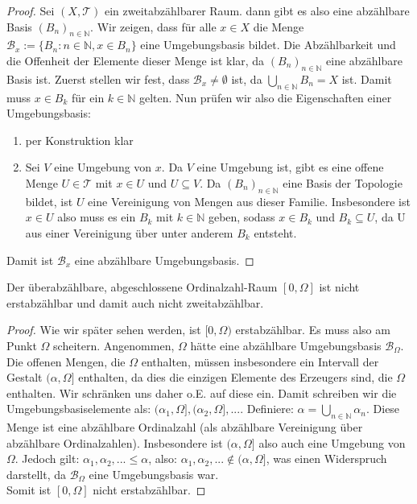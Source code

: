 \documentclass[11pt]{scrartcl}
\begin{document}
\begin{proof}
	Sei $(X,\mathcal T)$ ein zweitabzählbarer Raum. dann gibt es also 
	eine abzählbare Basis $(B_n)_{n\in\mathbb N}$. Wir zeigen, dass für alle $x\in X$ die Menge
	$\mathcal B_x:=\{B_n: n\in \mathbb N, x\in B_n\}$ eine Umgebungsbasis bildet. Die Abzählbarkeit und die Offenheit der Elemente
	dieser Menge ist klar, da $(B_n)_{n\in\mathbb N}$ eine abzählbare Basis ist. Zuerst stellen wir fest, dass $\mathcal B_x\neq\emptyset$ ist,
	da $\bigcup_{n\in\mathbb N} B_n=X$ ist. Damit muss $x\in B_k$ für ein $k\in\mathbb N$ gelten. Nun prüfen wir also 
	die Eigenschaften einer Umgebungsbasis:
	\begin{enumerate}
		\item per Konstruktion klar
		\item Sei $V$ eine Umgebung von $x$. Da $V$ eine Umgebung ist, gibt es eine offene
			Menge $U\in\mathcal T$ mit $x\in U$ und $U\subseteq V$. Da 
			$(B_n)_{n\in\mathbb N}$ eine Basis der Topologie bildet, ist $U$ eine 
			Vereinigung von Mengen aus dieser Familie. Insbesondere ist $x\in U$ also
			muss es ein $B_k$ mit $k\in \mathbb N$ geben, sodass $x\in B_k$ und 
			$B_k\subseteq U$, da U aus einer Vereinigung über unter anderem $B_k$ entsteht.
	\end{enumerate}
	Damit ist $\mathcal B_x$ eine abzählbare Umgebungsbasis.
\end{proof}
\begin{theorem}
	Der überabzählbare, abgeschlossene Ordinalzahl-Raum $[0,\Omega]$ ist nicht erstabzählbar und 
	damit auch nicht zweitabzählbar.
\end{theorem}
\begin{proof}
	Wie wir später sehen werden, ist $[0,\Omega)$ erstabzählbar. Es muss also am Punkt $\Omega$ scheitern.
	Angenommen, $\Omega$ hätte eine abzählbare Umgebungsbasis $\mathcal B_\Omega$. Die offenen Mengen, die $\Omega$
	enthalten, müssen insbesondere ein Intervall der Gestalt $(\alpha, \Omega]$ enthalten, da dies die einzigen 
	Elemente des Erzeugers sind, die $\Omega$ enthalten. Wir schränken uns daher o.E. auf diese ein. Damit schreiben
	wir die Umgebungsbasiselemente als: $(\alpha_1,\Omega],(\alpha_2, \Omega],...$. Definiere: $\alpha = \bigcup_{n\in\mathbb N} \alpha_n$.
	Diese Menge ist eine abzählbare Ordinalzahl (als abzählbare Vereinigung über abzählbare Ordinalzahlen). Insbesondere ist $(\alpha,\Omega]$ also
	auch eine Umgebung von $\Omega$. Jedoch gilt: $\alpha_1,\alpha_2,...\leq \alpha$, also: $\alpha_1,\alpha_2,...\notin (\alpha,\Omega]$, was
	einen Widerspruch darstellt, da $\mathcal B_\Omega$ eine Umgebungsbasis war.\\
	Somit ist $[0,\Omega]$ nicht erstabzählbar.
\end{proof}
\end{document}
